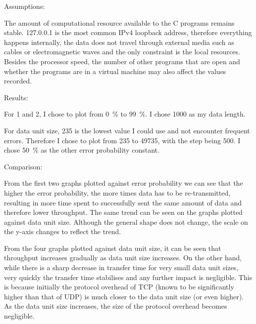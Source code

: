 \documentclass{exam}
\begin{document}
Assumptions:

The amount of computational resource available to the C programs remains stable. 127.0.0.1 is the most common IPv4 loopback address, therefore everything happens internally, the data does not travel through external media such as cables or electromagnetic waves and the only constraint is the local resources. Besides the processor speed, the number of other programs that are open and whether the programs are in a virtual machine may also affect the values recorded.

Results:

For 1 and 2, I chose to plot from \SI{0}{\percent} to \SI{99}{\percent}. I chose 1000 as my data length.

For data unit size, 235 is the lowest value I could use and not encounter frequent errors. Therefore I chose to plot from 235 to 49735, with the step being 500. I chose \SI{50}{\percent} as the other error probability constant.

Comparison:

From the first two graphs plotted against error probability we can see that the higher the error probability, the more times data has to be re-transmitted, resulting in more time spent to successfully sent the same amount of data and therefore lower throughput. The same trend  can be seen on the graphs plotted against data unit size. Although the general shape does not change, the scale on the y-axis changes to reflect the trend.

From the four graphs plotted against data unit size, it can be seen that throughput increases gradually as data unit size increases. On the other hand, while there is a sharp decrease in transfer time for very small data unit sizes, very quickly the transfer time stabilises and any further impact is negligible. This is because initially the protocol overhead of TCP (known to be significantly higher than that of UDP) is much closer to the data unit size (or even higher). As the data unit size increases, the size of the protocol overhead becomes negligible.
\end{document}
